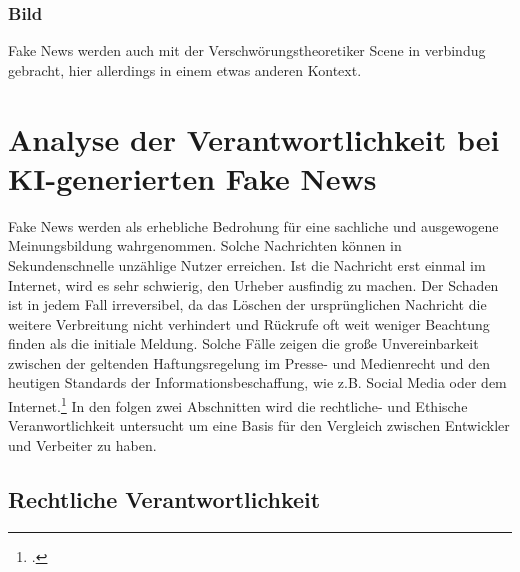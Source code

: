 \documentclass[Thesis.tex]{subfiles}
\begin{document}
\subsubsection{Bild}

Fake News werden auch mit der Verschwörungstheoretiker Scene in verbindug gebracht, hier allerdings in einem etwas anderen Kontext. 
\section{Analyse der Verantwortlichkeit bei KI-generierten Fake News}
Fake News werden als erhebliche Bedrohung für eine sachliche und ausgewogene Meinungsbildung wahrgenommen.
Solche Nachrichten können in Sekundenschnelle unzählige Nutzer erreichen.
Ist die Nachricht erst einmal im Internet, wird es sehr schwierig, den Urheber ausfindig zu machen.
Der Schaden ist in jedem Fall irreversibel, da das Löschen der ursprünglichen Nachricht die weitere Verbreitung
  nicht verhindert und Rückrufe oft weit weniger Beachtung finden als die initiale Meldung.
  Solche Fälle zeigen die große Unvereinbarkeit zwischen der geltenden Haftungsregelung im Presse- 
  und Medienrecht und den heutigen Standards der Informationsbeschaffung, wie z.B. Social Media oder 
  dem Internet.\footcite{DBWDUmgangmitFakenews} 
In den folgen zwei Abschnitten wird die rechtliche- und Ethische Veranwortlichkeit untersucht um eine
Basis für den Vergleich zwischen Entwickler und Verbeiter zu haben.

\subsection{Rechtliche Verantwortlichkeit}
\end{document}
